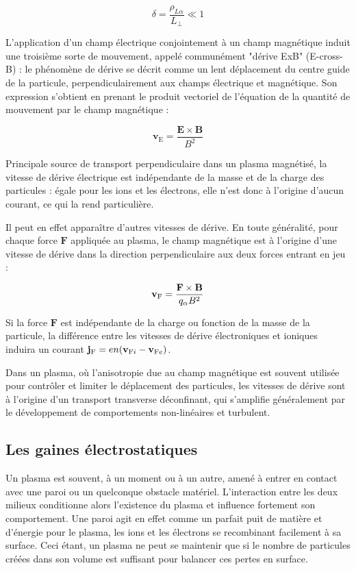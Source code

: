 \begin{refsection}
\begin{equation}
\delta=\frac{\rho_{L\alpha}}{L_\perp}\ll 1
\end{equation}

L'application d'un champ électrique conjointement à un champ magnétique
induit une troisième sorte de mouvement, appelé communément "dérive
ExB" (E-cross-B) : le phénomène de dérive se décrit comme un lent déplacement du
centre guide de la particule, perpendiculairement aux champs électrique et
magnétique. Son expression s'obtient en
prenant le produit vectoriel de l'équation de la quantité de mouvement par le
champ magnétique :

\begin{equation}
\mathbf{v}_\text{E}=\frac{\mathbf{E}\times\mathbf{B}}{B^2}
\end{equation}

Principale source de transport perpendiculaire
dans un plasma magnétisé, la vitesse de dérive électrique est indépendante de
la masse et de la charge des particules : égale pour les ions et les électrons, elle n'est donc à
l'origine d'aucun courant, ce qui la rend particulière. 

Il peut en effet apparaître d'autres vitesses de dérive. En toute généralité, 
pour chaque force $\mathbf F$ appliquée au plasma, le champ magnétique est à
l'origine d'une vitesse de dérive dans la direction perpendiculaire aux deux
forces entrant en jeu :

\begin{equation}
\mathbf{v}{_{\text{F}}}=\frac{\mathbf{F}\times\mathbf{B}}{q_\alpha B^2}
\end{equation}

Si la force $\mathbf F$ est indépendante de la charge ou
fonction de la masse de la particule, la différence entre les vitesses de dérive
électroniques et ioniques induira un courant $\mathbf
j{_{\text{F}}}=en(\mathbf v{_{\text{F}{i}}}-\mathbf
v{_{\text{F}{e}}})$. 

Dans un plasma, où l'anisotropie due au champ
magnétique est souvent utilisée pour contrôler et limiter le déplacement des
particules, les vitesses de dérive sont à l'origine d'un transport
 transverse déconfinant, qui s'amplifie généralement par le développement de
 comportements non-linéaires et turbulent.
 
\subsection{Les gaines électrostatiques}
\label{1-gaines}
Un plasma est souvent, à un moment ou à un autre, amené à entrer en contact avec
une paroi ou un quelconque obstacle matériel. L'interaction entre
les deux milieux conditionne alors l'existence du plasma et influence
fortement son comportement. Une paroi agit en effet comme un parfait
puit de matière et d'énergie pour le plasma, les ions et les électrons se
recombinant facilement à sa surface. Ceci étant, un plasma ne peut se maintenir
que si le nombre de particules créées dans son volume est suffisant pour
balancer ces pertes en surface. 


\end{refsection}
